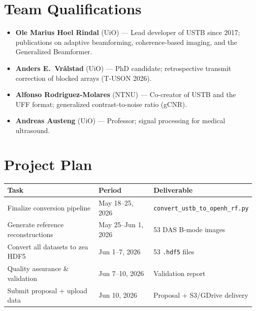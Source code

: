 \documentclass[11pt,a4paper]{article}
\begin{document}
\section{Team Qualifications}

\begin{itemize}[nosep]
  \item \textbf{Ole Marius Hoel Rindal} (UiO) --- Lead developer of USTB since 2017; publications on adaptive beamforming, coherence-based imaging, and the Generalized Beamformer.
  \item \textbf{Anders E.\ Vr\aa lstad} (UiO) --- PhD candidate; retrospective transmit correction of blocked arrays (T-USON 2026).
  \item \textbf{Alfonso Rodriguez-Molares} (NTNU) --- Co-creator of USTB and the UFF format; generalized contrast-to-noise ratio (gCNR).
  \item \textbf{Andreas Austeng} (UiO) --- Professor; signal processing for medical ultrasound.
\end{itemize}

\section{Project Plan}

\begin{table}[h!]
\centering
\small
\begin{tabular}{@{}lll@{}}
\toprule
\textbf{Task} & \textbf{Period} & \textbf{Deliverable} \\
\midrule
Finalize conversion pipeline & May 18--25, 2026 & \texttt{convert\_ustb\_to\_openh\_rf.py} \\
Generate reference reconstructions & May 25--Jun 1, 2026 & 53 DAS B-mode images \\
Convert all datasets to zea HDF5 & Jun 1--7, 2026 & 53 \texttt{.hdf5} files \\
Quality assurance \& validation & Jun 7--10, 2026 & Validation report \\
Submit proposal + upload data & Jun 10, 2026 & Proposal + S3/GDrive delivery \\
\bottomrule
\end{tabular}
\end{table}
\end{document}
